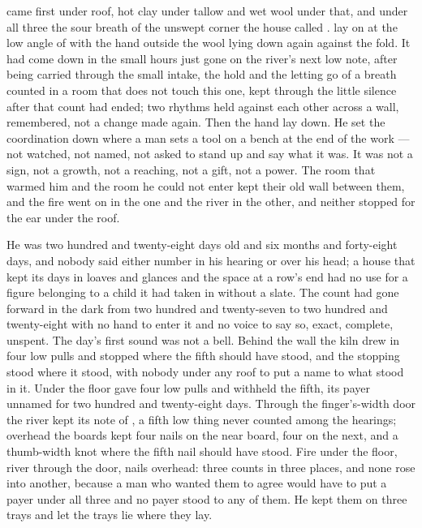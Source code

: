 
 came first under  roof, hot clay under tallow and wet wool under that, and under all three the sour  breath of the unswept corner the house called .  lay on  at the low angle of  with the hand outside the wool lying down again against the fold. It had come down in the small hours just gone on the river's next low note, after being carried through the small intake, the hold and the letting go of a breath counted in a room that does not touch this one, kept through the little silence after that count had ended; two rhythms held against each other across a wall, remembered, not a change made again. Then the hand lay down. He set the coordination down where a man sets a tool on a bench at the end of the work --- not watched, not named, not asked to stand up and say what it was. It was not a sign, not a growth, not a reaching, not a gift, not a power. The room that warmed him and the room he could not enter kept their old wall between them, and the fire went on in the one and the river in the other, and neither stopped for the ear under the roof.

He was two hundred and twenty-eight days old and six months and forty-eight days, and nobody said either number in his hearing or over his head; a house that kept its days in loaves and glances and the space at a row's end had no use for a figure belonging to a child it had taken in without a slate. The count had gone forward in the dark from two hundred and twenty-seven to two hundred and twenty-eight with no hand to enter it and no voice to say so, exact, complete, unspent. The day's first sound was not a bell. Behind the wall the kiln drew in four low pulls and stopped where the fifth should have stood, and the stopping stood where it stood, with nobody under any roof to put a name to what stood in it. Under the floor  gave four low pulls and withheld the fifth, its payer unnamed for two hundred and twenty-eight days. Through the finger's-width door the river kept its note of , a fifth low thing never counted among the hearings; overhead the boards kept four nails on the near board, four on the next, and a thumb-width knot where the fifth nail should have stood. Fire under the floor, river through the door, nails overhead: three counts in three places, and none rose into another, because a man who wanted them to agree would have to put a payer under all three and no payer stood to any of them. He kept them on three trays and let the trays lie where they lay.

